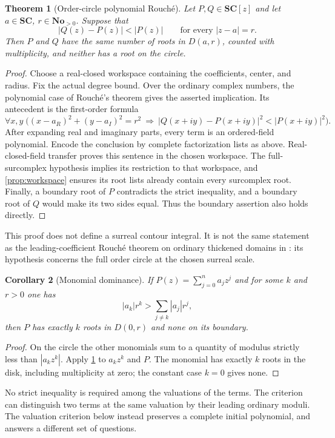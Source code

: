 \documentclass[11pt,letterpaper]{article}
\numberwithin{equation}{section}
\newtheorem{theorem}{Theorem}[section]
\newtheorem{corollary}[theorem]{Corollary}
\theoremstyle{definition}
\theoremstyle{remark}\newtheorem{remark}[theorem]{Remark}
\newcommand{\No}{\mathbf{No}}
\newcommand{\SC}{\mathbf{SC}}
\begin{document}
\begin{theorem}[Order-circle polynomial Rouch\'e]\label{thm:ordrouche}
Let $P,Q\in\SC[z]$ and let $a\in\SC$, $r\in\No_{>0}$. Suppose that
\begin{equation}\label{eq:ordrouche}
 |Q(z)-P(z)|<|P(z)|\qquad\text{for every }|z-a|=r.
\end{equation}
Then $P$ and $Q$ have the same number of roots in $D(a,r)$, counted
with multiplicity, and neither has a root on the circle.
\end{theorem}
\begin{proof}
Choose a real-closed workspace containing the coefficients, center,
and radius. Fix the actual degree bound. Over the ordinary complex
numbers, the polynomial case of Rouch\'e's theorem gives the asserted
implication. Its antecedent is the first-order formula
\[
 \forall x,y\;\bigl((x-a_R)^2+(y-a_I)^2=r^2
 \ \Longrightarrow\ |Q(x+iy)-P(x+iy)|^2<|P(x+iy)|^2\bigr).
\]
After expanding real and imaginary parts, every term is an ordered-field
polynomial. Encode the conclusion by complete factorization lists as
above. Real-closed-field transfer proves this sentence in the chosen
workspace. The full-surcomplex hypothesis implies its restriction to
that workspace, and \cref{prop:workspace} ensures its root lists already
contain every surcomplex root. Finally, a boundary root of $P$ contradicts
the strict inequality, and a boundary root of $Q$ would make its two
sides equal. Thus the boundary assertion also holds directly.
\end{proof}
This proof does not define a surreal contour integral. It is not the
same statement as the leading-coefficient Rouch\'e theorem on ordinary
thickened domains in \cite{SourceAnalysis}: its hypothesis concerns the
full order circle at the chosen surreal scale.

\begin{corollary}[Monomial dominance]\label{cor:pellet}
If $P(z)=\sum_{j=0}^na_jz^j$ and for some $k$ and $r>0$ one has
\[
 |a_k|r^k>\sum_{j\ne k}|a_j|r^j,
\]
then $P$ has exactly $k$ roots in $D(0,r)$ and none on its boundary.
\end{corollary}
\begin{proof}
On the circle the other monomials sum to a quantity of modulus strictly
less than $|a_kz^k|$. Apply \cref{thm:ordrouche} to $a_kz^k$ and $P$.
The monomial has exactly $k$ roots in the disk, including multiplicity
at zero; the constant case $k=0$ gives none.
\end{proof}
No strict inequality is required among the valuations of the terms.
The criterion can distinguish two terms at the same valuation by their
leading ordinary moduli. The valuation criterion below instead preserves
a complete initial polynomial, and answers a different set of questions.
\end{document}

